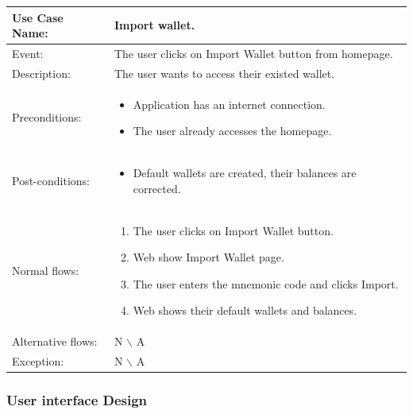 \begin{table}[]
    \begin{tabular}{m{4cm} m{11cm} }
        \toprule
        Use Case Name:     & Import wallet.                                    \\ 
        \midrule 
        Event:             & The user clicks on Import Wallet button from homepage. \\ 
        \midrule 
        Description:       & The user wants to access their existed wallet.  \\ 
        \midrule 
        Preconditions:     & \begin{itemize}
            \item Application has an internet connection.
            \item The user already accesses the homepage.
        \end{itemize}                           \\ 
        \midrule 
        Post-conditions:   & \begin{itemize}
            \item Default wallets are created, their balances are corrected.
        \end{itemize}                           \\ 
        \midrule 
        Normal flows:      & \begin{enumerate}
            \item The user clicks on Import Wallet button.
            \item Web show Import Wallet page.
            \item The user enters the mnemonic code and clicks Import.
            \item Web shows their default wallets and balances.
        \end{enumerate}                           \\ 
        \midrule 
        Alternative flows: & N $\backslash$ A                                     \\
        \midrule 
        Exception:         &              N $\backslash$ A          \\ 
        \bottomrule
    \end{tabular}
\end{table}

\clearpage

\subsubsection{User interface Design}
\bigskip

